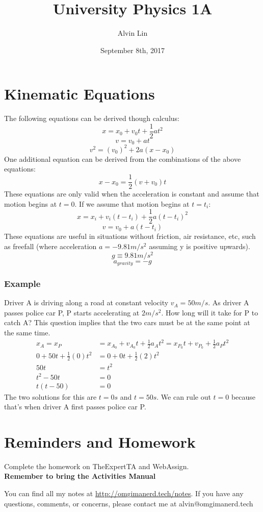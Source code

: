 \documentclass[letterpaper, 12pt]{math}
\title{University Physics 1A}
\author{Alvin Lin}
\date{September 8th, 2017}
\begin{document}
\maketitle

\section*{Kinematic Equations}
The following equations can be derived though calculus:
\[ x = x_0+v_0t+\frac{1}{2}at^2 \]
\[ v = v_0+at \]
\[ v^2 = (v_0)^2+2a(x-x_0) \]
One additional equation can be derived from the combinations of the above
equations:
\[ x-x_0 = \frac{1}{2}(v+v_0)t \]
These equations are only valid when the acceleration is constant and assume that
motion begins at \( t = 0 \). If we assume that motion begins at \( t = t_i \):
\[ x = x_i+v_i(t-t_i)+\frac{1}{2}a(t-t_i)^2 \]
\[ v = v_0+a(t-t_i) \]
These equations are useful in situations without friction, air resistance, etc,
such as freefall (where acceleration \( a = -9.81m/s^2 \) assuming y is
positive upwards).
\[ g \equiv 9.81m/s^2 \]
\[ a_{gravity} = -g \]

\subsubsection*{Example}
Driver A is driving along a road at constant velocity \( v_A = 50m/s \). As
driver A passes police car P, P starts accelerating at \( 2m/s^2 \). How long
will it take for P to catch A? This question implies that the two cars must be
at the same point at the same time.
\begin{align*}
  x_A = x_P &= x_{A_0}+v_{A_0}t+\frac{1}{2}a_At^2 =
    x_{P_0}t+v_{P_0}+\frac{1}{2}a_Pt^2 \\
  0+50t+\frac{1}{2}(0)t^2 &= 0+0t+\frac{1}{2}(2)t^2 \\
  50t &= t^2 \\
  t^2-50t &= 0 \\
  t(t-50) &= 0
\end{align*}
The two solutions for this are \( t = 0s \) and \( t = 50s \). We can rule out
\( t = 0 \) because that's when driver A first passes police car P.

\section*{Reminders and Homework}
Complete the homework on TheExpertTA and WebAssign. \\
\textbf{Remember to bring the Activities Manual}

\begin{center}
  You can find all my notes at \url{http://omgimanerd.tech/notes}. If you have
  any questions, comments, or concerns, please contact me at
  alvin@omgimanerd.tech
\end{center}
\end{document}
